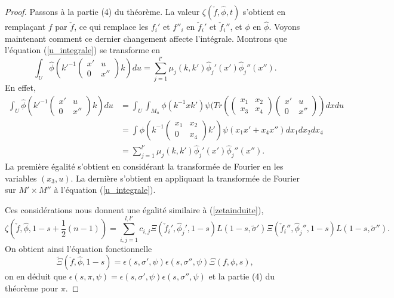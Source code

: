 \begin{proof}
Passons à la partie (4) du théorème. La valeur $\zeta(\check{f}, \hat{\phi}, t)$ s'obtient en remplaçant $f$ par $\check{f}$, ce qui remplace les $f_i'$ et $f''_i$ en $\check{f}_i'$ et $\check{f}_i''$, et $\phi$ en $\hat{\phi}$. Voyons maintenant comment ce dernier changement affecte l'intégrale. Montrons que l'équation (\ref{u_integrale}) se transforme en
\begin{equation}
\int_U \hat{\phi}(k'^{-1}\begin{pmatrix} 
x' & u \\
0 & x'' 
\end{pmatrix} k) du = \sum_{j=1}^{l'} \mu_j(k, k')\hat{\phi}_j'(x')\hat{\phi}_j''(x'').
\end{equation}
En effet, 
\begin{align}
\int_U \hat{\phi}(k'^{-1}\begin{pmatrix} 
x' & u \\
0 & x'' 
\end{pmatrix} k) du &= \int_U \int_{M_n} \phi(k^{-1}xk')\psi(Tr(\begin{pmatrix} 
x_1 & x_2 \\
x_3 & x_4 
\end{pmatrix}\begin{pmatrix} 
x' & u \\
0 & x'' 
\end{pmatrix})dxdu \\
&= \int \phi(k^{-1}\begin{pmatrix} 
x_1 & x_2 \\
0 & x_4 
\end{pmatrix}k')\psi(x_1x'+x_4x'')dx_1dx_2dx_4 \\
&= \sum_{j=1}^{l'} \mu_j(k, k')\hat{\phi}_j'(x')\hat{\phi}_j''(x'').
\end{align}
La première égalité s'obtient en considérant la transformée de Fourier en les variables $(x_3, u)$. La dernière s'obtient en appliquant la transformée de Fourier sur $M'\times M''$ à l'équation (\ref{u_integrale}).

Ces considérations nous donnent une égalité similaire à (\ref{zetainduite}),
\begin{equation}
\zeta(\check{f},\hat{\phi},1-s+\frac{1}{2}(n-1))=\sum_{i,j=1}^{l,l'}c_{i,j}\Xi(\check{f}_i',\hat{\phi}_j',1-s)L(1-s,\tilde{\sigma}')\Xi(\check{f}_i'',\hat{\phi}_j'',1-s)L(1-s,\tilde{\sigma}'').
\end{equation}
On obtient ainsi l'équation fonctionnelle
\begin{equation}
\tilde{\Xi}(\check{f}, \hat{\phi}, 1-s)=\epsilon(s, \sigma', \psi)\epsilon(s,\sigma'',\psi)\Xi(f,\phi,s),
\end{equation}
on en déduit que $\epsilon(s,\pi,\psi)=\epsilon(s, \sigma', \psi)\epsilon(s,\sigma'',\psi)$ et la partie (4) du théorème pour $\pi$.


\end{proof}
